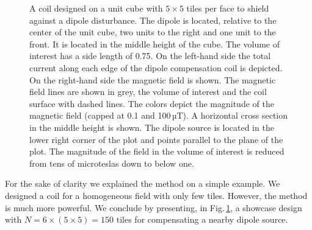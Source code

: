 \begin{figure}
  \centering
  \quad
  \caption{A coil designed on a unit cube with $5 \times 5$ tiles per face to shield against a dipole disturbance. The dipole is located, relative to the center of the unit cube, two units to the right and one unit to the front. It is located in the middle height of the cube. The volume of interest has a side length of 0.75. On the left-hand side the total current along each edge of the dipole compensation coil is depicted. On the right-hand side the magnetic field is shown. The magnetic field lines are shown in grey, the volume of interest and the coil surface with dashed lines. The colors depict the magnitude of the magnetic field (capped at 0.1 and 100\,µT). A horizontal cross section in the middle height is shown. The dipole source is located in the lower right corner of the plot and points parallel to the plane of the plot. The magnitude of the field in the volume of interest is reduced from tens of microteslas down to below one.}
  \label{fig:showcase}
\end{figure}

For the sake of clarity we explained the method on a simple example. We designed a coil for a homogeneous field with only few tiles. However, the method is much more powerful. We conclude by presenting, in Fig.\,\ref{fig:showcase}, a showcase design with $N = 6 \times (5 \times 5) = 150$ tiles for compensating a nearby dipole source.

